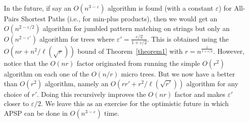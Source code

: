 \documentclass[11pt]{llncs}
\begin{document}
In the future, if say an $O(n^{3-\varepsilon})$ algorithm is found (with a constant $\varepsilon$) for All-Pairs Shortest Paths (i.e., for min-plus products), then we would get an $O(n^{2-\varepsilon/2})$ algorithm for jumbled pattern matching on strings but only an $O(n^{2-\varepsilon'})$ algorithm for trees where $\varepsilon' = \frac{\varepsilon/2}{1+\varepsilon/2}$.  This is obtained using the $O(nr+ n^2/\ell(\sqrt{r}))$ bound of Theorem~\ref{theorem1} with $r=n^\frac{1}{1+\varepsilon/2}$. However, notice that the $O(nr)$ factor originated from running the simple $O(r^2)$ algorithm on each one of the $O(n/r)$ micro trees. But we now have a better than $O(r^2)$ algorithm, namely an $O(rr'+ r^2/\ell(\sqrt{r'}))$ algorithm for any choice of $r'$. Doing this recursively improves the $O(nr)$ factor and makes $\varepsilon'$ closer to $\varepsilon/2$. We leave this as an exercise for the optimistic future in which APSP can be done in $O(n^{3-\varepsilon})$ time.






\end{document}
